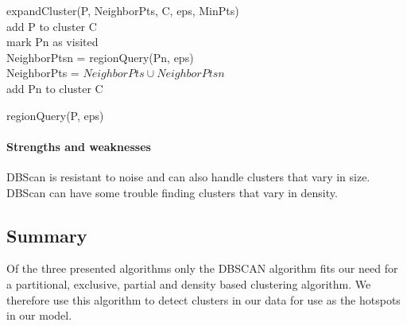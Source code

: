 \begin{algorithm}
expandCluster(P, NeighborPts, C, eps, MinPts)\\
	add P to cluster C\\
	{
		{
			mark Pn as visited\\
			NeighborPtsn = regionQuery(Pn, eps)\\
		}
		{
			NeighborPts = $ NeighborPts \cup NeighborPtsn $\\
			{add Pn to cluster C\\}
		}
	}
\end{algorithm}

\begin{algorithm}
regionQuery(P, eps)\\
\end{algorithm}
\paragraph{Strengths and weaknesses}
DBScan is resistant to noise and can also handle clusters that vary in size.
DBScan can have some trouble finding clusters that vary in density.

\subsection{Summary} Of the three presented algorithms only the DBSCAN algorithm fits our need for a partitional, exclusive, partial and density based clustering algorithm.
We therefore use this algorithm to detect clusters in our data for use as the hotspots in our model.